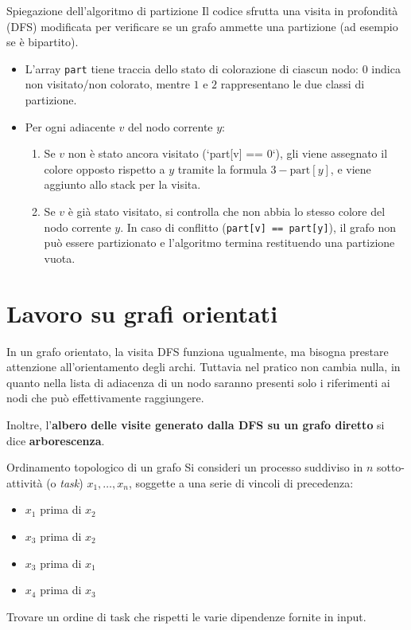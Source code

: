 \documentclass[12pt]{report}
\begin{document}
	\begin{algoritmo}{Spiegazione dell'algoritmo di partizione}{}
		Il codice sfrutta una visita in profondità (DFS) modificata per verificare se un grafo ammette una partizione (ad esempio se è bipartito).
		\begin{itemize}
			\item L'array \texttt{part} tiene traccia dello stato di colorazione di ciascun nodo: $0$ indica non visitato/non colorato, mentre $1$ e $2$ rappresentano le due classi di partizione.
			\item Per ogni adiacente $v$ del nodo corrente $y$:
			\begin{enumerate}
				\item Se $v$ non è stato ancora visitato (`part[v] == 0`), gli viene assegnato il colore opposto rispetto a $y$ tramite la formula $3 - \text{part}[y]$, e viene aggiunto allo stack per la visita.
				
				\item Se $v$ è già stato visitato, si controlla che non abbia lo stesso colore del nodo corrente $y$. In caso di conflitto (\texttt{part[v] == part[y]}), il grafo non può essere partizionato e l'algoritmo termina restituendo una partizione vuota.
			\end{enumerate}
		\end{itemize}
		
	\end{algoritmo}
	
	\section{Lavoro su grafi orientati}
	
	In un grafo orientato, la visita DFS funziona ugualmente, ma bisogna prestare attenzione all'orientamento degli archi. Tuttavia nel pratico non cambia nulla, in quanto nella lista di adiacenza di un nodo saranno presenti solo i riferimenti ai nodi che può effettivamente raggiungere.
	
	Inoltre, l'\textbf{albero delle visite generato dalla DFS su un grafo diretto} si dice \textbf{arborescenza}.
	
	\begin{esercizio}{Ordinamento topologico di un grafo}{}
		Si consideri un processo suddiviso in $n$ sotto-attività (o \textit{task}) $x_1, \dots, x_n$, soggette a una serie di vincoli di precedenza:
		\begin{itemize}
			\item $x_1$ prima di $x_2$
			\item $x_3$ prima di $x_2$
			\item $x_3$ prima di $x_1$
			\item $x_4$ prima di $x_3$
		\end{itemize}
		Trovare un ordine di task che rispetti le varie dipendenze fornite in input.
	\end{esercizio}
	
\end{document}

